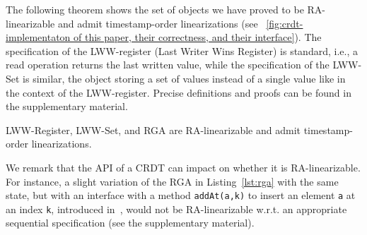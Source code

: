 The following theorem shows the set of objects we have proved to be RA-linearizable and admit timestamp-order linearizations (see \figureautorefname~\ref{fig:crdt-implementaton of this paper, their correctness, and their interface}). The specification of the LWW-register (Last Writer Wins Register) is standard, i.e., a read operation returns the last written value, while the specification of the LWW-Set is similar, the object storing a set of values instead of a single value like in the context of the LWW-register. Precise definitions and proofs can be found in the supplementary material.

\begin{theorem}\label{th:ts_order_objects}
LWW-Register, LWW-Set, and RGA are RA-linearizable and admit timestamp-order linearizations.
\end{theorem}

We remark that the API of a CRDT can impact on whether it is
RA-linearizable. For instance, a slight variation of the RGA in
Listing~\ref{lst:rga} with the same state, but with an interface with
a method \lstinline|addAt(a,k)| to insert an element \lstinline|a| at an index \lstinline|k|, introduced in~\cite{AttiyaBGMYZ16}, would not be RA-linearizable w.r.t. an appropriate sequential specification (see the supplementary material). 

